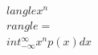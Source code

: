 \documentclass[preview]{standalone}
\begin{document}
\begin{align*}
\quad\\langle x^n \quad\\rangle = \quad\\int_{-\infty}^{\infty} x^n p(x) dx
\end{align*}
\end{document}
